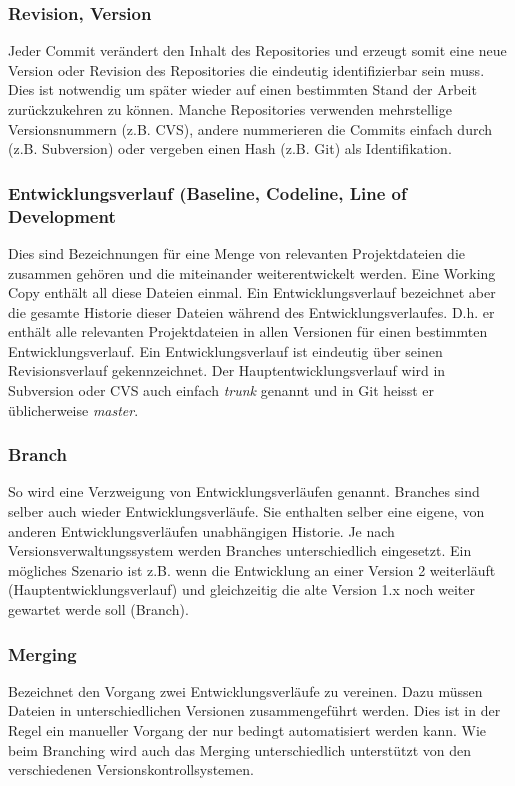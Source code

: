 \documentclass[10pt]{article}
\begin{document}
    \subsubsection{Revision, Version}
    Jeder Commit ver\"andert den Inhalt des Repositories und erzeugt somit eine neue Version oder Revision des Repositories die eindeutig identifizierbar sein muss. Dies ist notwendig um sp\"ater wieder auf einen bestimmten Stand der Arbeit zur\"uckzukehren zu k\"onnen. Manche Repositories verwenden mehrstellige Versionsnummern (z.B. CVS), andere nummerieren die Commits einfach durch (z.B. Subversion) oder vergeben einen Hash (z.B. Git) als Identifikation.
    \subsubsection{Entwicklungsverlauf (Baseline, Codeline, Line of Development}
    Dies sind Bezeichnungen f\"ur eine Menge von relevanten Projektdateien die zusammen geh\"oren und die miteinander weiterentwickelt werden. Eine Working Copy enth\"alt all diese Dateien einmal. Ein Entwicklungsverlauf bezeichnet aber die gesamte Historie dieser Dateien w\"ahrend des Entwicklungsverlaufes. D.h. er enth\"alt alle relevanten Projektdateien in allen Versionen f\"ur einen bestimmten Entwicklungsverlauf. Ein Entwicklungsverlauf ist eindeutig \"uber seinen Revisionsverlauf gekennzeichnet. Der Hauptentwicklungsverlauf wird in Subversion oder CVS auch einfach \textit{trunk} genannt und in Git heisst er \"ublicherweise \textit{master}.

    \subsubsection{Branch}
    So wird eine Verzweigung von Entwicklungsverl\"aufen genannt. Branches sind selber auch wieder Entwicklungsverl\"aufe. Sie enthalten selber eine eigene, von anderen Entwicklungsverl\"aufen unabh\"angigen Historie. Je nach Versionsverwaltungssystem werden Branches unterschiedlich eingesetzt. Ein m\"ogliches Szenario ist z.B. wenn die Entwicklung an einer Version 2 weiterl\"auft (Hauptentwicklungsverlauf) und gleichzeitig die alte Version 1.x noch weiter gewartet werde soll (Branch).

    \subsubsection{Merging}
    Bezeichnet den Vorgang zwei Entwicklungsverl\"aufe zu vereinen. Dazu m\"ussen Dateien in unterschiedlichen Versionen zusammengef\"uhrt werden. Dies ist in der Regel ein manueller Vorgang der nur bedingt automatisiert werden kann. Wie beim Branching wird auch das Merging unterschiedlich unterst\"utzt von den verschiedenen Versionskontrollsystemen.
\end{document}
